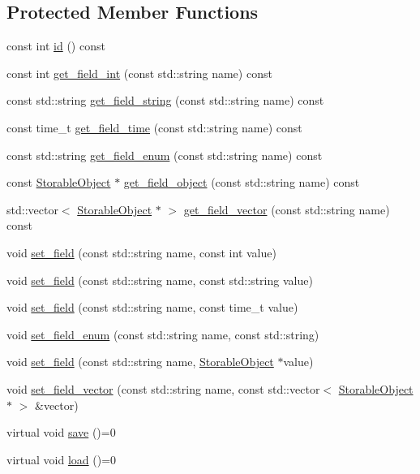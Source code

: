 \subsection*{Protected Member Functions}
\begin{DoxyCompactItemize}
\item 
const int \hyperlink{classStorage_1_1StorableObject_ae3e389b184651f78594df7f83f944a2c}{id} () const 
\item 
const int \hyperlink{classStorage_1_1StorableObject_a11a172f37f8805453225be4fa98e87ae}{get\_\-field\_\-int} (const std::string name) const 
\item 
const std::string \hyperlink{classStorage_1_1StorableObject_a533b48a050009b86e376269e886d3eeb}{get\_\-field\_\-string} (const std::string name) const 
\item 
const time\_\-t \hyperlink{classStorage_1_1StorableObject_a8c4e071ed59d2cdd5d2a00806211b4e1}{get\_\-field\_\-time} (const std::string name) const 
\item 
const std::string \hyperlink{classStorage_1_1StorableObject_abcaf10bdc0f2db297c53cbd9ca0acd4d}{get\_\-field\_\-enum} (const std::string name) const 
\item 
const \hyperlink{classStorage_1_1StorableObject}{StorableObject} $\ast$ \hyperlink{classStorage_1_1StorableObject_a19bd5f8f17473ffac0042a6ef5c66da7}{get\_\-field\_\-object} (const std::string name) const 
\item 
std::vector$<$ \hyperlink{classStorage_1_1StorableObject}{StorableObject} $\ast$ $>$ \hyperlink{classStorage_1_1StorableObject_ad6df389823d8f812e4c64994d440475b}{get\_\-field\_\-vector} (const std::string name) const 
\item 
void \hyperlink{classStorage_1_1StorableObject_a4c15433a6719f4036705d989828e4933}{set\_\-field} (const std::string name, const int value)
\item 
void \hyperlink{classStorage_1_1StorableObject_a95c8d3440fa0ef6bce0f8d3bbac1f477}{set\_\-field} (const std::string name, const std::string value)
\item 
void \hyperlink{classStorage_1_1StorableObject_af16a9fb211fd421a5aa89d741a67c2fb}{set\_\-field} (const std::string name, const time\_\-t value)
\item 
void \hyperlink{classStorage_1_1StorableObject_a14764d884ae0cfc51aab3c391423f781}{set\_\-field\_\-enum} (const std::string name, const std::string)
\item 
void \hyperlink{classStorage_1_1StorableObject_accb8821bf03946d15bd04ab3555ab20e}{set\_\-field} (const std::string name, \hyperlink{classStorage_1_1StorableObject}{StorableObject} $\ast$value)
\item 
void \hyperlink{classStorage_1_1StorableObject_adb46898ef1cc21af62eeff54a583e8d4}{set\_\-field\_\-vector} (const std::string name, const std::vector$<$ \hyperlink{classStorage_1_1StorableObject}{StorableObject} $\ast$ $>$ \&vector)
\item 
virtual void \hyperlink{classStorage_1_1StorableObject_a85609f4a18b49c7e0eed0205ee6df5d9}{save} ()=0
\item 
virtual void \hyperlink{classStorage_1_1StorableObject_ab92526b66762a9099d720cf28bfc4151}{load} ()=0
\end{DoxyCompactItemize}
